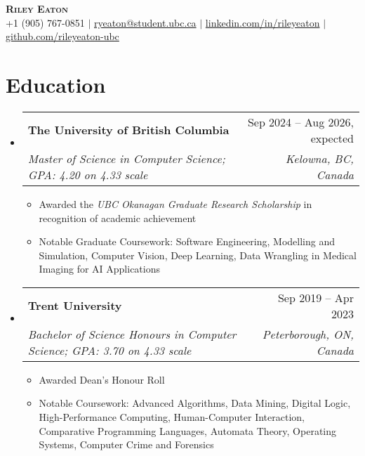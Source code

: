 \documentclass[letterpaper,11.5pt]{article}
\makeatletter
\newcommand{\resumeItem}[1]{
  \item\small{
    {#1 \vspace{-2pt}}
  }
}
\newcommand{\resumeSubheading}[4]{
  \vspace{-2pt}\item
    \begin{tabular*}{0.97\textwidth}[t]{l@{\extracolsep{\fill}}r}
      \textbf{#1} & #2 \\
      \textit{\small#3} & \textit{\small #4} \\
    \end{tabular*}\vspace{-7pt}
}
\newcommand{\resumeSubHeadingListStart}{\begin{itemize}[leftmargin=0.15in, label={}]}
\newcommand{\resumeSubHeadingListEnd}{\end{itemize}}
\newcommand{\resumeItemListStart}{\begin{itemize}}
\newcommand{\resumeItemListEnd}{\end{itemize}\vspace{-5pt}}
\def\iconSpace{0.5pt}
\makeatother
\begin{document}
\begin{center}
    \textbf{\Huge \scshape Riley Eaton} \\ \vspace{1pt}
    \small \faPhoneSquare \hspace{\iconSpace} +1 (905) 767-0851
    $|$ \faEnvelope \hspace{\iconSpace} \href{mailto:ryeaton@student.ubc.ca}{ryeaton@student.ubc.ca}
    $|$ \faLinkedinSquare \hspace{\iconSpace} \href{https://linkedin.com/in/rileyeaton}{linkedin.com/in/rileyeaton}
    $|$ \faGithub \hspace{\iconSpace} \href{https://github.com/rileyeaton-ubc}{github.com/rileyeaton-ubc}
\end{center}

\section{Education}
  \resumeSubHeadingListStart
    \resumeSubheading
      {The University of British Columbia}{Sep 2024 -- Aug 2026, expected}
      {Master of Science in Computer Science; GPA: 4.20 on 4.33 scale}{Kelowna, BC, Canada}
      \resumeItemListStart
        \resumeItem{Awarded the \emph{UBC Okanagan Graduate Research Scholarship} in recognition of academic achievement}
        \resumeItem{Notable Graduate Coursework: Software Engineering, Modelling and Simulation, Computer Vision, Deep Learning, Data Wrangling in Medical Imaging for AI Applications}
      \resumeItemListEnd
    \resumeSubheading
      {Trent University}{Sep 2019 -- Apr 2023}
      {Bachelor of Science Honours in Computer Science; GPA: 3.70 on 4.33 scale}{Peterborough, ON, Canada}
      \resumeItemListStart
        \resumeItem{Awarded Dean's Honour Roll}
        \resumeItem{Notable Coursework: Advanced Algorithms, Data Mining, Digital Logic, High-Performance Computing, Human-Computer Interaction, Comparative Programming Languages, Automata Theory, Operating Systems, Computer Crime and Forensics}
      \resumeItemListEnd
  \resumeSubHeadingListEnd

\end{document}
